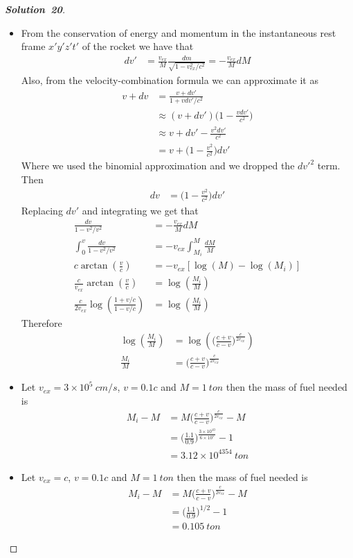 \documentclass[11pt]{article}
\newcommand{\sci}[1]{\times 10^{#1}}
\theoremstyle{definition}
\renewcommand*{\proofname}{\bf{Solution}}
\begin{document}
\cleardoublepage
\begin{proof}[\proofname\ 20]\leavevmode\par
\begin{itemize}
\item [(a)] From the conservation of energy and momentum in the instantaneous
rest frame $x'y'z't'$ of the rocket we have that
\begin{align*}
    dv' &= \frac{v_{ex}}{M}\frac{dm}{\sqrt{1 - v_{ex}^2/c^2}}
    = - \frac{v_{ex}}{M} dM
\end{align*}
Also, from the velocity-combination formula we can approximate it as
\begin{align*}
    v + dv
    &= \frac{v + dv'}{1 + vdv'/c^2} \\
    &\approx (v + dv')\bigg(1 - \frac{vdv'}{c^2}\bigg) \\
    &\approx v + dv' - \frac{v^2dv'}{c^2} \\
    &= v + \bigg(1 - \frac{v^2}{c^2}\bigg)dv'
\end{align*}
Where we used the binomial approximation and we dropped the $dv'^2$ term.
Then
\begin{align*}
    dv &= \bigg(1 - \frac{v^2}{c^2}\bigg)dv'
\end{align*}
Replacing $dv'$ and integrating we get that
\begin{align*}
    \frac{dv}{1 - v^2/v^2} &= -\frac{v_{ex}}{M}dM \\
    \int_0^v \frac{dv}{1 - v^2/v^2} &= -v_{ex}\int_{M_i}^M\frac{dM}{M} \\
    c\arctan(\frac{v}{c}) &= -v_{ex} [\log(M) - \log(M_i)] \\
    \frac{c}{v_{ex}}\arctan(\frac{v}{c}) &= \log(\frac{M_i}{M}) \\
    \frac{c}{2v_{ex}}\log(\frac{1 + v/c}{1 - v/c}) &= \log(\frac{M_i}{M})
\end{align*}
Therefore
\begin{align*}
    \log(\frac{M_i}{M}) &= \log(\bigg(\frac{c + v}{c - v}\bigg)^{\frac{c}{2v_{ex}}}) \\
    \frac{M_i}{M} &= \bigg(\frac{c + v}{c - v}\bigg)^{\frac{c}{2v_{ex}}}
\end{align*}
\item [(b)] Let $v_{ex} = 3\sci{5}~cm/s$, $v = 0.1 c$ and $M = 1~ton$ then
the mass of fuel needed is 
\begin{align*}
    M_i - M &= M\bigg(\frac{c + v}{c - v}\bigg)^{\frac{c}{2v_{ex}}} - M \\
    &=\bigg(\frac{1.1}{0.9}\bigg)^{\frac{3\sci{10}}{6\sci{5}}} - 1 \\
    &= 3.12 \sci{4354}~ton
\end{align*}
\item [(c)] Let $v_{ex} = c$, $v = 0.1 c$ and $M = 1~ton$ then
the mass of fuel needed is 
\begin{align*}
    M_i - M &= M\bigg(\frac{c + v}{c - v}\bigg)^{\frac{c}{2v_{ex}}} - M \\
    &=\bigg(\frac{1.1}{0.9}\bigg)^{1/2} - 1 \\
    &= 0.105~ton
\end{align*}

\end{itemize}
\end{proof}
\end{document}
